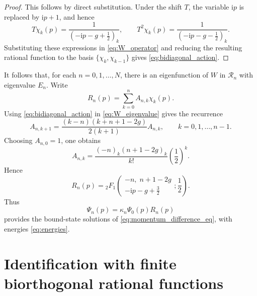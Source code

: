 \documentclass[10pt,a4paper]{amsart}
\newcommand{\ii}{\mathrm{i}}
\newcommand{\cR}{\mathcal{R}}
\numberwithin{equation}{section}
\begin{document}
\begin{proof}
This follows by direct substitution.  Under the shift $T$, the variable $\ii p$ is replaced by
$\ii p+1$, and hence
\begin{equation}
  T\chi_k(p)=\frac{1}{\left(-\ii p-g+\frac12\right)_k},
  \qquad
  T^2\chi_k(p)=\frac{1}{\left(-\ii p-g-\frac12\right)_k}.
\end{equation}
Substituting these expressions in \eqref{eq:W_operator} and reducing the resulting rational
function to the basis $\{\chi_k,\chi_{k-1}\}$ gives \eqref{eq:bidiagonal_action}.
\end{proof}

It follows that, for each $n=0,1,\dots,N$, there is an eigenfunction of $W$ in $\cR_n$ with
eigenvalue $E_n$.  Write
\begin{equation}
  R_n(p)=\sum_{k=0}^{n} A_{n,k}\chi_k(p).
  \label{eq:R_expansion}
\end{equation}
Using \eqref{eq:bidiagonal_action} in \eqref{eq:W_eigenvalue} gives the recurrence
\begin{equation}
  A_{n,k+1}
  =\frac{(k-n)(k+n+1-2g)}{2(k+1)}A_{n,k},
  \qquad k=0,1,\dots,n-1.
  \label{eq:A_recurrence}
\end{equation}
Choosing $A_{n,0}=1$, one obtains
\begin{equation}
  A_{n,k}=\frac{(-n)_k(n+1-2g)_k}{k!}\left(\frac12\right)^k.
  \label{eq:A_coefficients}
\end{equation}
Hence
\begin{equation}
  R_n(p)=
  {}_2F_1\!\left(
  \begin{matrix}
  -n,\; n+1-2g\\
  -\ii p-g+\frac32
  \end{matrix};\frac12
  \right).
  \label{eq:R_hypergeometric}
\end{equation}
Thus
\begin{equation}
  \Psi_n(p)=\kappa_n\Psi_0(p)R_n(p)
  \label{eq:Psi_R_solution}
\end{equation}
provides the bound-state solutions of \eqref{eq:momentum_difference_eq}, with energies
\eqref{eq:energies}.

\section{Identification with finite biorthogonal rational functions}\label{sec:kmj}
\end{document}
